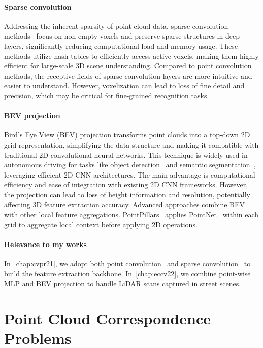 \paragraph{Sparse convolution}
Addressing the inherent sparsity of point cloud data, sparse convolution methods~\cite{tang2022torchsparse,hackel2020inference,3DSemanticSegmentationWithSubmanifoldSparseConvNet} focus on non-empty voxels and preserve sparse structures in deep layers, significantly reducing computational load and memory usage. These methods utilize hash tables to efficiently access active voxels, making them highly efficient for large-scale 3D scene understanding. Compared to point convolution methods, the receptive fields of sparse convolution layers are more intuitive and easier to understand. However, voxelization can lead to loss of fine detail and precision, which may be critical for fine-grained recognition tasks.

\paragraph{BEV projection}
Bird's Eye View (BEV) projection transforms point clouds into a top-down 2D grid representation, simplifying the data structure and making it compatible with traditional 2D convolutional neural networks. This technique is widely used in autonomous driving for tasks like object detection~\cite{zhou2018voxelnet,lang2019pointpillars} and semantic segmentation~\cite{aksoy2020salsanet}, leveraging efficient 2D CNN architectures. The main advantage is computational efficiency and ease of integration with existing 2D CNN frameworks. However, the projection can lead to loss of height information and resolution, potentially affecting 3D feature extraction accuracy. Advanced approaches combine BEV with other local feature aggregations. PointPillars~\cite{lang2019pointpillars} applies PointNet~\cite{qi2017pointnet} within each grid to aggregate local context before applying 2D operations.

\paragraph{Relevance to my works} In~\cref{chap:cvpr21}, we adopt both point convolution~\cite{thomas2019kpconv} and sparse convolution~\cite{choy2019Minkowski} to build the feature extraction backbone. In~\cref{chap:eccv22}, we combine point-wise MLP and BEV projection to handle LiDAR scans captured in street scenes. 

\section{Point Cloud Correspondence Problems}
\label{sec:bg_problems}
